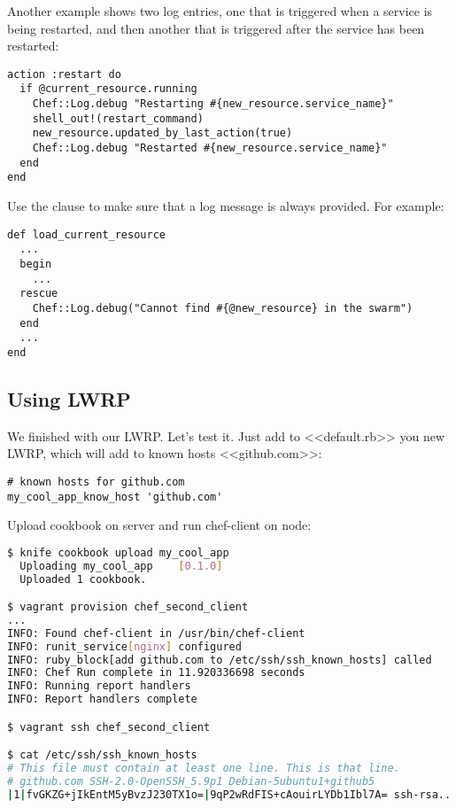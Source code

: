 Another example shows two log entries, one that is triggered when a service is being restarted, and then another that is triggered after the service has been restarted:

\begin{lstlisting}[label=lst:cookbook-lwrp-logs3]
action :restart do
  if @current_resource.running
    Chef::Log.debug "Restarting #{new_resource.service_name}"
    shell_out!(restart_command)
    new_resource.updated_by_last_action(true)
    Chef::Log.debug "Restarted #{new_resource.service_name}"
  end
end
\end{lstlisting}

Use the  clause to make sure that a log message is always provided. For example:

\begin{lstlisting}[label=lst:cookbook-lwrp-logs3]
def load_current_resource
  ...
  begin
    ...
  rescue
    Chef::Log.debug("Cannot find #{@new_resource} in the swarm")
  end
  ...
end
\end{lstlisting}

\subsection{Using LWRP}

We finished with our LWRP. Let's test it. Just add to <<default.rb>> you new LWRP, which will add to known hosts <<github.com>>:

\begin{lstlisting}[label=lst:cookbook-lwrp4,title=my-server-cloud/site-cookbooks/my\_cool\_app/recipes/default.rb]
# known hosts for github.com
my_cool_app_know_host 'github.com'
\end{lstlisting}

Upload cookbook on server and run chef-client on node:

\begin{lstlisting}[language=Bash,label=lst:cookbook-lwrp5]
$ knife cookbook upload my_cool_app
  Uploading my_cool_app    [0.1.0]
  Uploaded 1 cookbook.

$ vagrant provision chef_second_client
...
INFO: Found chef-client in /usr/bin/chef-client
INFO: runit_service[nginx] configured
INFO: ruby_block[add github.com to /etc/ssh/ssh_known_hosts] called
INFO: Chef Run complete in 11.920336698 seconds
INFO: Running report handlers
INFO: Report handlers complete

$ vagrant ssh chef_second_client

$ cat /etc/ssh/ssh_known_hosts
# This file must contain at least one line. This is that line.
# github.com SSH-2.0-OpenSSH_5.9p1 Debian-5ubuntu1+github5
|1|fvGKZG+jIkEntM5yBvzJ230TX1o=|9qP2wRdFIS+cAouirLYDb1Ibl7A= ssh-rsa...
\end{lstlisting}

